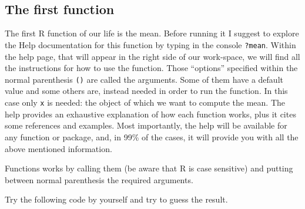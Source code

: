 \documentclass[
]{article}
\begin{document}
~

~

\hypertarget{the-first-function}{%
\subsection{The first function}\label{the-first-function}}

The first R function of our life is the mean. Before running it I
suggest to explore the Help documentation for this function by typing in
the console \texttt{?mean}. Within the help page, that will appear in the right
side of our work-space, we will find all the instructions for how to use
the function. Those ``options'' specified within the normal parenthesis
\texttt{()} are called the arguments. Some of them have a default value and
some others are, instead needed in order to run the function. In this
case only \texttt{x} is needed: the object of which we want to compute the
mean. The help provides an exhaustive explanation of how each function
works, plus it cites some references and examples. Most importantly, the
help will be available for any function or package, and, in 99\% of the
cases, it will provide you with all the above mentioned information.

Functions works by calling them (be aware that R is case sensitive) and
putting between normal parenthesis the required arguments.

Try the following code by yourself and try to guess the result.
\end{document}
